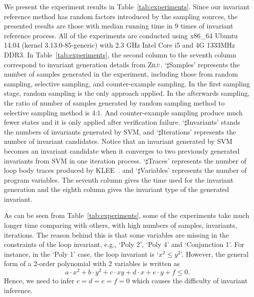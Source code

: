 We present the experiment results in Table~\ref{tab:experiments}. 
Since our invariant reference method has random factors introduced by the sampling sources, 
the presented results are those with median running time in $9$ times of invariant reference process. 
All of the experiments are conducted using x86\_64 Ubuntu 14.04 (kernel 3.13.0-85-generic) 
with 2.3 GHz Intel Core i5 and 4G 1333MHz DDR3. 
In Table~\ref{tab:experiments}, the second column to the seventh column correspond to 
invariant generation details from \textsc{Zilu}. 
`$\sharp$Samples' represents the number of samples generated in the experiment, 
including those from random sampling, selective sampling, and counter-example sampling. 
In the first sampling stage, random sampling is the only approach applied.
In the afterwards sampling, the ratio of number of samples generated by random sampling method to selective sampling method is 4:1.
And counter-example sampling produce much fewer states and it is only applied after verification failure. 
`$\sharp$Invariants' stands the numbers of invariants generated by SVM, 
and `$\sharp$Iterations' represents the number of invariant candidates. 
Notice that an invariant generated by SVM becomes an invariant candidate 
when it converges to two previously generated invariants from SVM in one iteration process. 
`$\sharp$Traces' represents the number of loop body traces produced by KLEE~\cite{cadar2008klee}. 
and `$\sharp$Variables' represents the number of program variables. 
The seventh column gives the time used for the invariant generation 
and the eighth column gives the invariant type of the generated invariant. 

As can be seen from Table~\ref{tab:experiments}, 
some of the experiments take much longer time comparing with others, 
with high numbers of samples, invariants, iterations. 
The reason behind this is 
that some variables are missing in the constraints of the loop invariant, 
e.g., `Poly 2', `Poly 4' and `Conjunction 1'.  
For instance, in the `Poly 1' case, the loop invariant is `$x^2 \le y^2$'. 
However, the general form of a 2-order polynomial with 2 variables 
is written as 
\[
    a \cdot x^2 + b \cdot y^2 + c \cdot x y + d \cdot x + e \cdot y + f \le 0. 
\] 
Hence, we need to infer $c = d = e = f = 0$ 
which causes the difficulty of invariant inference. 


